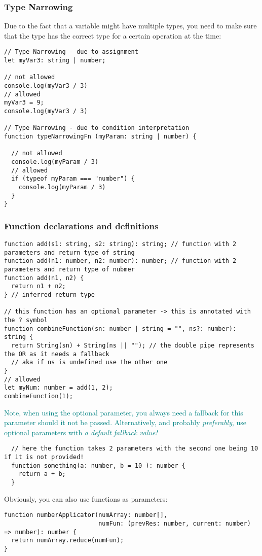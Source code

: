 \documentclass[main.tex,fontsize=8pt,paper=a4,paper=portrait,DIV=calc,]{scrartcl}
\begin{document}
\subsubsection{Type Narrowing}
Due to the fact that a variable might have multiple types, you need to make sure that the type has the correct type for a certain operation at the time:
\begin{lstlisting}
// Type Narrowing - due to assignment
let myVar3: string | number;

// not allowed
console.log(myVar3 / 3)
// allowed
myVar3 = 9;
console.log(myVar3 / 3)

// Type Narrowing - due to condition interpretation
function typeNarrowingFn (myParam: string | number) {

  // not allowed
  console.log(myParam / 3)
  // allowed
  if (typeof myParam === "number") {
    console.log(myParam / 3)
  }
}
\end{lstlisting}

\subsubsection{Function declarations and definitions}
\begin{lstlisting}
function add(s1: string, s2: string): string; // function with 2 parameters and return type of string
function add(n1: number, n2: number): number; // function with 2 parameters and return type of nubmer
function add(n1, n2) {
  return n1 + n2;
} // inferred return type

// this function has an optional parameter -> this is annotated with the ? symbol
function combineFunction(sn: number | string = "", ns?: number): string {
  return String(sn) + String(ns || ""); // the double pipe represents the OR as it needs a fallback
  // aka if ns is undefined use the other one
}
// allowed
let myNum: number = add(1, 2);
combineFunction(1);
\end{lstlisting}
\textcolor{teal}{Note, when using the optional parameter, you always need a fallback for this parameter should it not be passed. \newline
Alternatively, and probably \emph{preferably}, use optional parameters with \emph{a default fallback value!}}
\begin{lstlisting}
  // here the function takes 2 parameters with the second one being 10 if it is not provided!
  function something(a: number, b = 10 ): number {
    return a + b; 
  }
\end{lstlisting}
Obviously, you can also use functions as parameters:
\begin{lstlisting}
function numberApplicator(numArray: number[],
                          numFun: (prevRes: number, current: number) => number): number {
  return numArray.reduce(numFun);
}
\end{lstlisting}
\end{document}
